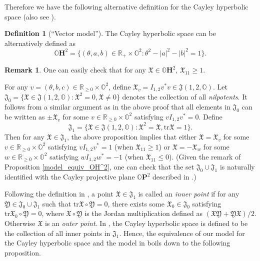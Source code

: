 \documentclass{article}
\newcommand{\union}{\cup}
\newcommand{\OO}{\mathbb{O}}
\newcommand{\RR}{\mathbb{R}}
\newcommand{\tr}{\mathrm{tr}}
\newcommand{\FFJ}{\mathfrak{J}}
\newcommand{\FFX}{\mathfrak{X}}
\newcommand{\FFY}{\mathfrak{Y}}
\theoremstyle{definition}
\newtheorem{dfn}[thm]{Definition}
\newtheorem*{rmk}{Remark}
\begin{document}
Therefore we have the following alternative definition for the Cayley hyperbolic space (also see \cite[page 87]{Parker}).
\begin{dfn}[``Vector model'']\label{vector_model_OH^2}
The Cayley hyperbolic space can be alternatively defined as $$\OO\mathbf{H}^2=\{(\theta,a,b)\in\RR_{+}\times\OO^2: \theta^2-|a|^2-|b|^2=1\}.$$
\end{dfn}
\begin{rmk}
One can easily check that for any $\FFX\in\OO\mathbf{H}^2$, $\FFX_{11}\geq 1$. 

\iffalse
 For any $v=(\theta,b,c)\in\RR_{\geq 0}\times\OO^2$, define $\FFX_v=I_{1,2}v^*v\in\FFJ(1,2,\OO)$. Let $\FFJ_0=\{\FFX\in\FFJ(1,2,\OO):\FFX^2=0,\FFX\neq 0\}$ denotes the collection of all \emph{nilpotents}. It follows from a similar argument as in the above proof that all elements in $\FFJ_0$ can be written as $\pm\FFX_v$ for some $v\in\RR_{\geq 0}\times\OO^2$ satisfying $vI_{1,2}v^*=0$. Define
$$\FFJ_1=\{\FFX\in\FFJ(1,2,\OO):\FFX^2=\FFX,\tr\FFX=1\}.$$
Then for any $\FFX\in\FFJ_1$, the above proposition implies that either $\FFX=\FFX_v$ for some $v\in\RR_{\geq 0}\times\OO^2$ satisfying $vI_{1,2}v^*=1$ (when $\FFX_{11}\geq 1$) or $\FFX=-\FFX_w$ for some $w\in\RR_{\geq 0}\times\OO^2$ satisfying $wI_{1,2}w^*=-1$ (when $\FFX_{11}\leq 0$). (Given the remark of Proposition \ref{model_equiv_OH^2}, one can check that the set $\FFJ_0\union\FFJ_1$ is naturally identified with the Cayley projective plane $\OO\mathbf{P}^2$ described in \cite[\S19. Spaces of $\RR$-rank 1, page 137]{Mostow73}.)

Following the definition in \cite{Mostow73}, a point $\FFX\in\FFJ_1$ is called an \emph{inner point} if for any $\FFY\in\FFJ_0\cup\FFJ_1$ such that $\tr\FFX\circ\FFY= 0$, there exists some $\FFX_0\in\FFJ_0$ satisfying $\tr\FFX_0\circ\FFY=0$, where $\FFX\circ\FFY$ is the Jordan multiplication defined as $(\FFX\FFY+\FFY\FFX)/2$. Otherwise $\FFX$ is an \emph{outer point}. In \cite[\S19. Spaces of $\RR$-rank 1, page 138]{Mostow73}, the Cayley hyperbolic space is defined to be the collection of all inner points in $\FFJ_1$. Hence, the equivalence of our model for the Cayley hyperbolic space and the model in \cite[\S19. Spaces of $\RR$-rank 1]{Mostow73} boils down to the following proposition.


\end{rmk}
\end{document}
